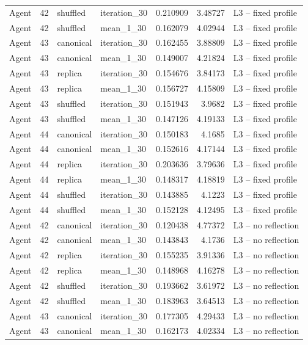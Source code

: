 \begin{table}[htbp!]
\begin{tabular}{lrllrrl}
Agent & 42 & shuffled & iteration\_30 & 0.210909 & 3.48727 & L3 -- fixed profile \\
Agent & 42 & shuffled & mean\_1\_30 & 0.162079 & 4.02944 & L3 -- fixed profile \\
Agent & 43 & canonical & iteration\_30 & 0.162455 & 3.88809 & L3 -- fixed profile \\
Agent & 43 & canonical & mean\_1\_30 & 0.149007 & 4.21824 & L3 -- fixed profile \\
Agent & 43 & replica & iteration\_30 & 0.154676 & 3.84173 & L3 -- fixed profile \\
Agent & 43 & replica & mean\_1\_30 & 0.156727 & 4.15809 & L3 -- fixed profile \\
Agent & 43 & shuffled & iteration\_30 & 0.151943 & 3.9682 & L3 -- fixed profile \\
Agent & 43 & shuffled & mean\_1\_30 & 0.147126 & 4.19133 & L3 -- fixed profile \\
Agent & 44 & canonical & iteration\_30 & 0.150183 & 4.1685 & L3 -- fixed profile \\
Agent & 44 & canonical & mean\_1\_30 & 0.152616 & 4.17144 & L3 -- fixed profile \\
Agent & 44 & replica & iteration\_30 & 0.203636 & 3.79636 & L3 -- fixed profile \\
Agent & 44 & replica & mean\_1\_30 & 0.148317 & 4.18819 & L3 -- fixed profile \\
Agent & 44 & shuffled & iteration\_30 & 0.143885 & 4.1223 & L3 -- fixed profile \\
Agent & 44 & shuffled & mean\_1\_30 & 0.152128 & 4.12495 & L3 -- fixed profile \\
Agent & 42 & canonical & iteration\_30 & 0.120438 & 4.77372 & L3 -- no reflection \\
Agent & 42 & canonical & mean\_1\_30 & 0.143843 & 4.1736 & L3 -- no reflection \\
Agent & 42 & replica & iteration\_30 & 0.155235 & 3.91336 & L3 -- no reflection \\
Agent & 42 & replica & mean\_1\_30 & 0.148968 & 4.16278 & L3 -- no reflection \\
Agent & 42 & shuffled & iteration\_30 & 0.193662 & 3.61972 & L3 -- no reflection \\
Agent & 42 & shuffled & mean\_1\_30 & 0.183963 & 3.64513 & L3 -- no reflection \\
Agent & 43 & canonical & iteration\_30 & 0.177305 & 4.29433 & L3 -- no reflection \\
Agent & 43 & canonical & mean\_1\_30 & 0.162173 & 4.02334 & L3 -- no reflection \\

\end{tabular}
\end{table}
